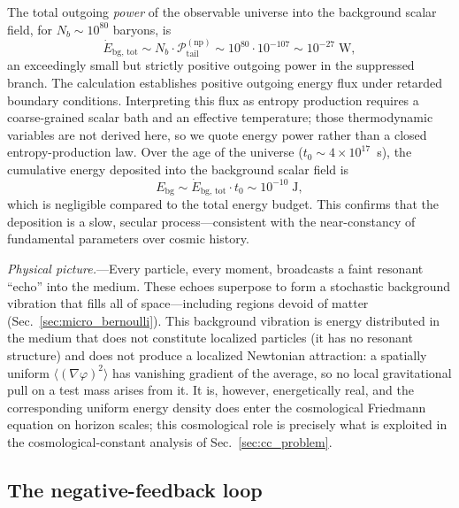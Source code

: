 \documentclass[aps,prd,onecolumn,superscriptaddress,nofootinbib,showpacs,12pt,notitlepage]{revtex4-2}
\begin{document}
The total outgoing \emph{power} of the observable
universe into the background scalar field, for
$N_b \sim 10^{80}$ baryons, is
\begin{equation}\label{eq:S_dot}
  \dot{E}_{\mathrm{bg,\,tot}} \sim
  N_b \cdot \mathcal{P}_{\mathrm{tail}}^{\mathrm{(np)}}
  \sim 10^{80} \cdot 10^{-107} \sim 10^{-27}\;\mathrm{W},
\end{equation}
an exceedingly small but strictly positive outgoing power in the
suppressed branch.  The calculation establishes positive outgoing
energy flux under retarded boundary conditions.  Interpreting this
flux as entropy production requires a coarse-grained scalar bath and
an effective temperature; those thermodynamic variables are not
derived here, so we quote energy power rather than a closed
entropy-production law.
Over the age of the universe ($t_0 \sim 4 \times 10^{17}$~s),
the cumulative energy deposited into the background scalar
field is
\begin{equation}\label{eq:E_cumulative}
  E_{\mathrm{bg}} \sim \dot{E}_{\mathrm{bg,\,tot}} \cdot t_0
  \sim 10^{-10}\;\mathrm{J},
\end{equation}
which is negligible compared to the total energy budget.
This confirms that the deposition is a slow, secular
process---consistent with the near-constancy of
fundamental parameters over cosmic history.

\textit{Physical picture.}---Every particle, every moment,
broadcasts a faint resonant ``echo'' into the medium.
These echoes superpose to form a stochastic background
vibration that fills all of space---including regions devoid
of matter (Sec.~\ref{sec:micro_bernoulli}).  This background
vibration is energy distributed in the medium that does not
constitute localized particles (it has no resonant structure)
and does not produce a localized Newtonian attraction: a
spatially uniform $\langle(\nabla\varphi)^{2}\rangle$ has
vanishing gradient of the average, so no local
gravitational pull on a test mass arises from it.  It is,
however, energetically real, and the corresponding uniform
energy density does enter the cosmological Friedmann equation
on horizon scales; this cosmological role is precisely what
is exploited in the cosmological-constant analysis of
Sec.~\ref{sec:cc_problem}.

\subsection{The negative-feedback loop}
\label{sec:feedback}
\end{document}
